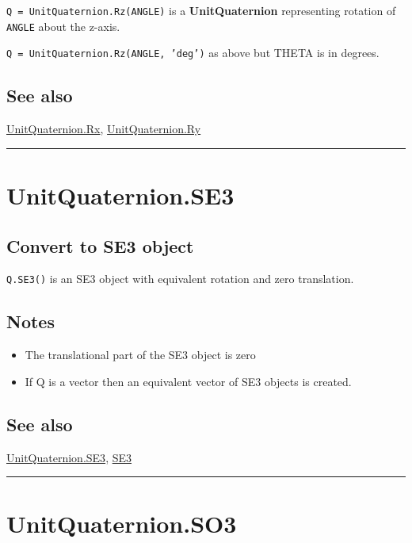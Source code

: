 \texttt{Q = UnitQuaternion.Rz(ANGLE)} is a \textbf{\color{red} UnitQuaternion} representing rotation of \texttt{ANGLE} about the z-axis.



\texttt{Q = UnitQuaternion.Rz(ANGLE, 'deg')} as above but THETA is in degrees.


\subsection*{See also}


\hyperlink{UnitQuaternion.Rx}{\color{blue} UnitQuaternion.Rx}, \hyperlink{UnitQuaternion.Ry}{\color{blue} UnitQuaternion.Ry}

\vspace{1.5ex}\hrule

\hypertarget{UnitQuaternion.SE3}{\section*{UnitQuaternion.SE3}}
\subsection*{Convert to SE3 object}


\texttt{Q.SE3()} is an SE3 object with equivalent rotation and zero translation.


\subsection*{Notes}
\begin{itemize}
  \item The translational part of the SE3 object is zero
  \item If Q is a vector then an equivalent vector of SE3 objects is created.
\end{itemize}

\subsection*{See also}


\hyperlink{UnitQuaternion.SE3}{\color{blue} UnitQuaternion.SE3}, \hyperlink{SE3}{\color{blue} SE3}

\vspace{1.5ex}\hrule

\hypertarget{UnitQuaternion.SO3}{\section*{UnitQuaternion.SO3}}
